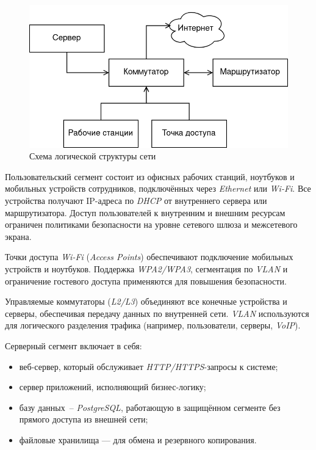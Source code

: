 \begin{figure}[h]
\centering
    \includegraphics[width=0.8\linewidth]{assets/hardware-logical-network-structure.png}
    \caption{Схема логической структуры сети}
    \label{fig:system-implementation:hardware:logical-network}
\end{figure}

Пользовательский сегмент состоит из офисных рабочих станций, ноутбуков и мобильных устройств сотрудников, подключённых через \textit{Ethernet} или \textit{Wi-Fi}. Все устройства получают IP-адреса по \textit{DHCP} от внутреннего сервера или маршрутизатора. Доступ пользователей к внутренним и внешним ресурсам ограничен политиками безопасности на уровне сетевого шлюза и межсетевого экрана.

Точки доступа \textit{Wi-Fi} (\textit{Access Points}) обеспечивают подключение мобильных устройств и ноутбуков. Поддержка \textit{WPA2/WPA3}, сегментация по \textit{VLAN} и ограничение гостевого доступа применяются для повышения безопасности.

Управляемые коммутаторы (\textit{L2/L3}) объединяют все конечные устройства и серверы, обеспечивая передачу данных по внутренней сети. \textit{VLAN} используются для логического разделения трафика (например, пользователи, серверы, \textit{VoIP}).

Серверный сегмент включает в себя:

\begin{itemize}
    \item веб-сервер, который обслуживает \textit{HTTP/HTTPS}-запросы к системе;
    \item сервер приложений, исполняющий бизнес-логику;
    \item базу данных~-- \textit{PostgreSQL}, работающую в защищённом сегменте без прямого доступа из внешней сети;
    \item файловые хранилища — для обмена и резервного копирования.
\end{itemize}

